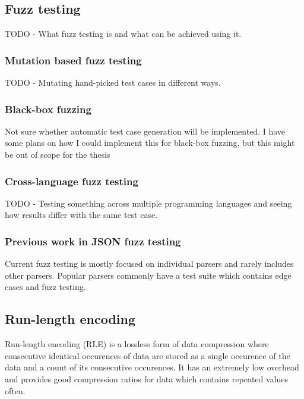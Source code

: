\documentclass[english, 12pt, a4paper, sci, utf8, a-2b, online]{aaltothesis}
\def\note#1{\begin{flushleft}
	{\color{orange} \raggedright \textsf{#1}}
 \linebreak \noindent
\end{flushleft}}
\begin{document}
\subsection{Fuzz testing}
\note{TODO - What fuzz testing is and what can be achieved using it.}


\subsubsection{Mutation based fuzz testing}
\note{TODO - Mutating hand-picked test cases in different ways.}



\subsubsection{Black-box fuzzing}
\note{Not sure whether automatic test case generation will be implemented. I have some plans on how I could implement this for black-box fuzzing, but this might be out of scope for the thesis}


\subsubsection{Cross-language fuzz testing}
\note{TODO - Testing something across multiple programming languages and seeing how results differ with the same test case.}



\subsubsection{Previous work in JSON fuzz testing}
Current fuzz testing is mostly focused on individual parsers and rarely includes other parsers. Popular parsers commonly have a test suite which contains edge cases and fuzz testing.


\subsection{Run-length encoding}
Run-length encoding (RLE) is a lossless form of data compression where consecutive identical occurences of data are stored as a single occurence of the data and a count of its consecutive occurences. It has an extremely low overhead and provides good compression ratios for data which contains repeated values often.
\end{document}
